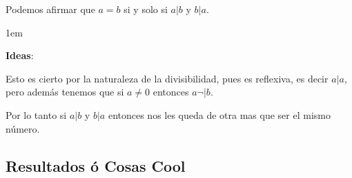 \documentclass[12pt, fleqn]{report}                             %
\newenvironment{SmallIndentation}[1][0.75em]                    %
    {\begin{adjustwidth}{#1}{}\begin{footnotesize}}                 %
    {\end{footnotesize}\end{adjustwidth}}                           %
\begin{document}
            Podemos afirmar que $a = b$ si y solo si $a|b$ y $b|a$.

            \begin{SmallIndentation}[1em]
                \textbf{Ideas}:

                Esto es cierto por la naturaleza de la divisibilidad, pues es reflexiva, es
                decir $a|a$, pero además tenemos que si $a \neq 0$ entonces $a\neg|b$.

                Por lo tanto si $a|b$ y $b|a$ entonces nos les queda de otra mas que ser el
                mismo número.
            \end{SmallIndentation}



        \clearpage
        \subsection{Resultados ó Cosas Cool}
\end{document}
